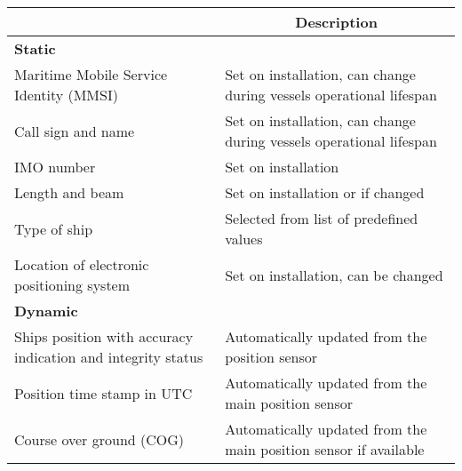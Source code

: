 \documentclass[../main.tex]{subfiles}
\begin{document}
\begin{table}[H]
\centering
\begin{tabular}{|m{5cm}|m{9cm}|}
\hline
\rowcolor[HTML]{C0C0C0} 
\multicolumn{1}{|c|}{\cellcolor[HTML]{C0C0C0}\textbf{Data}}  & \multicolumn{1}{c|}{\cellcolor[HTML]{C0C0C0}\textbf{Description}}                 \\ \hline
\rowcolor[HTML]{C0C0C0} 
\textbf{Static}                                              &                                                                                   \\ \hline
Maritime Mobile Service Identity (MMSI)                      & Set on installation, can change during vessels operational lifespan               \\ \hline
\rowcolor[HTML]{EFEFEF} 
Call sign and name                                           & Set on installation, can change during vessels operational lifespan               \\ \hline
IMO number                                                   & Set on installation                                                               \\ \hline
\rowcolor[HTML]{EFEFEF} 
Length and beam                                              & Set on installation or if changed                                                 \\ \hline
Type of ship                                                 & Selected from list of predefined values                                           \\ \hline
\rowcolor[HTML]{EFEFEF} 
Location of electronic positioning system                    & Set on installation, can be changed                                               \\ \hline
\rowcolor[HTML]{C0C0C0} 
\textbf{Dynamic}                                             &                                                                                   \\ \hline
Ships position with accuracy indication and integrity status & Automatically updated from the position sensor                                    \\ \hline
\rowcolor[HTML]{EFEFEF} 
Position time stamp in UTC                                   & Automatically updated from the main position sensor                               \\ \hline
Course over ground (COG)                                     & Automatically updated from the main position sensor if available                  \\ \hline

\end{tabular}
\end{table}
\end{document}
